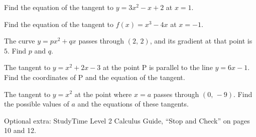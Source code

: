 \documentclass[11pt]{article}
\begin{document}
\Q Find the equation of the tangent to $y=3x^{2}-x+2$ at $x=1$.

\Q Find the equation of the tangent to $f(x)=x^{3}-4x$ at $x=-1$.

\Q The curve $y=px^{2}+qx$ passes through $(2,\,2)$, and its gradient at that point is $5$. Find $p$ and $q$.

\Q The tangent to $y=x^{2}+2x-3$ at the point P is parallel to the line $y=6x-1$. Find the coordinates of P and the equation of the tangent.

\QX The tangent to $y=x^{2}$ at the point where $x=a$ passes through $(0,\,-9)$. Find the possible values of $a$ and the equations of these tangents.
\ALine{}

\vfill
{\small Optional extra: StudyTime Level 2 Calculus Guide, ``Stop and Check'' on pages 10 and 12.\par}
\end{document}
